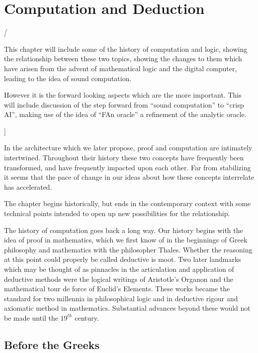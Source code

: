 
\chapter{Computation and Deduction}\label{ComputationAndDeduction}

{\it[

This chapter will include some of the history of computation and logic,
showing the relationship between these two topics, showing the
changes to them which have arisen from the advent of mathematical
logic and the digital computer, leading to the idea of sound
computation. 

However it is the forward looking aspects which are the more important.
This will include discussion of the step forward from ``sound
computation'' to ``crisp AI'', making use of the idea of ``FAn
oracle'' a refinement of the analytic oracle.

]}

In the architecture which we later propose, proof and computation are
intimately intertwined.
Throughout their history these two concepts have frequently been
transformed, and have frequently impacted upon each other.
Far from stabilizing it seems that the pace of change in our ideas
about how these concepts interrelate has accelerated.

The chapter begins historically, but ends in the contemporary context
with some technical points intended to open up new possibilities for the relationship.

The history of computation goes back a long way.
Our history begins with the idea of proof in mathematics, which we
first know of in the beginnings of Greek philosophy and mathematics
with the philosopher Thales.
Whether the reasoning at this point could properly be called deductive
is moot.
Two later landmarks which may be thought of as pinnacles in the
articulation and application of deductive methods were the logical
writings of Aristotle's Organon and the mathematical tour de force of Euclid's
Elements.
These works became the standard for two millennia in philosophical
logic and in deductive rigour and axiomatic method in mathematics.
Substantial advances beyond these would not be made until the
$19^{th}$ century.


\section{Before the Greeks}

